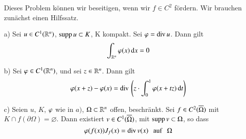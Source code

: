 Dieses Problem können wir beseitigen, wenn wir $f\in C^2$ fördern. Wir brauchen zunächst einen Hilfssatz.

\begin{prop}\label{2.7}
    \begin{description}
        \item{a)}
        Sei $u\in C^1(\mathbb{R}^n)$, $\mathrm{supp}\, u \subset K$, K kompakt. Sei $\varphi=\mathrm{div}\, u$. Dann gilt
        \[
            \int_{\mathbb{R}^n} \varphi (x) \, \mathrm{d} x=0
        \]
        \item{b)}
        Sei $\varphi \in C^1(\mathbb{R}^n)$, und sei $z\in \mathbb{R}^n$. Dann gilt
        \[
            \varphi (x+z)-\varphi(x)=\mathrm{div}\, \left( z\cdot \int_0^1 \varphi (x+tz) \, \mathrm{d} t\right)
        \]
        \item{c)}
        Seien $u$, $K$, $\varphi$ wie in $a)$, $\Omega \subset \mathbb{R}^n$ offen, beschränkt.
        Sei $f\in C^2(\overline \Omega)$ mit $K\cap f(\partial \Omega)=\varnothing$. Dann existiert
        $v\in C^1(\overline \Omega)$, mit $\mathrm{supp}\, v \subset \Omega$, so dass
        \[
            \varphi (f(x))J_f(x)=\mathrm{div}\, v(x) \hspace{.25cm} \text{auf} \hspace{.25cm} \Omega
        \]
    \end{description}
\end{prop}

